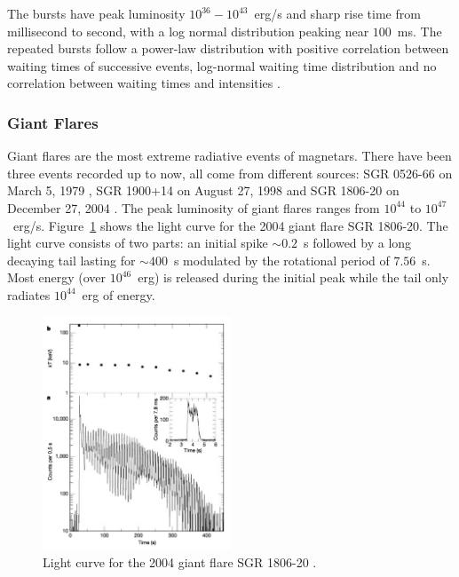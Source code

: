 The bursts have peak luminosity $10^{36}-10^{43}$~erg/s and sharp rise time from millisecond to second, with a log normal distribution peaking near $100$~ms.
The repeated bursts follow a power-law distribution with positive correlation between waiting times of successive events, log-normal waiting time distribution and no correlation between waiting times and intensities \citep{1996Natur.382..518C}.

\subsubsection{Giant Flares}
Giant flares are the most extreme radiative events of magnetars. 
There have been three events recorded up to now, all come from different sources: SGR 0526-66 on March 5, 1979 \citep{1980ApJ...237L...7E}, SGR 1900+14 on August 27, 1998 \citep{1999Natur.397...41H} and SGR 1806-20 on December 27, 2004 \citep{2005Natur.434.1098H,2005ApJ...624L.105M,2007ApJ...661..458B}.
The peak luminosity of giant flares ranges from $10^{44}$ to $10^{47}$~erg/s.
Figure~\ref{fig:gf-light-curve} shows the light curve for the 2004 giant flare SGR 1806-20. 
The light curve consists of two parts: an initial spike $\sim 0.2$~s followed by a long decaying tail lasting for $\sim 400$~s modulated by the rotational period of $7.56$~s.
Most energy (over $10^{46}$~erg) is released during the initial peak while the tail only radiates $10^{44}$~erg of energy.
%
\begin{figure}[h]
  \centering
  \includegraphics[width=0.5\textwidth]{pics/intro/gf.png}
  \caption[Light curve for the 2004 giant flare SGR 1806-20]{Light curve for the 2004 giant flare SGR 1806-20 \citep{2005Natur.434.1098H}.}
  \label{fig:gf-light-curve}
\end{figure}
%

